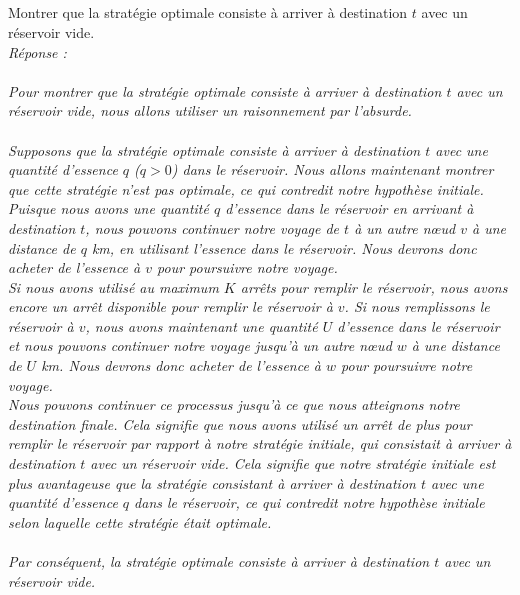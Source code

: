 \documentclass[a4paper,11pt]{article}
\begin{document}
        \subsection{}\label{subsec:Q2}
        Montrer que la stratégie optimale consiste à arriver à destination $t$ avec un réservoir vide.\\\textit{Réponse :\\\\
            Pour montrer que la stratégie optimale consiste à arriver à destination $t$ avec un réservoir vide, nous allons utiliser un raisonnement par l'absurde.\\\\
Supposons que la stratégie optimale consiste à arriver à destination $t$ avec une quantité d'essence $q$ ($q > 0$) dans le réservoir. Nous allons maintenant montrer que cette stratégie n'est pas optimale, ce qui contredit notre hypothèse initiale. \\
Puisque nous avons une quantité $q$ d'essence dans le réservoir en arrivant à destination $t$, nous pouvons continuer notre voyage de $t$ à un autre nœud $v$ à une distance de $q$ km, en utilisant l'essence dans le réservoir. Nous devrons donc acheter de l'essence à $v$ pour poursuivre notre voyage. \\
Si nous avons utilisé au maximum $K$ arrêts pour remplir le réservoir, nous avons encore un arrêt disponible pour remplir le réservoir à $v$. Si nous remplissons le réservoir à $v$, nous avons maintenant une quantité $U$ d'essence dans le réservoir et nous pouvons continuer notre voyage jusqu'à un autre nœud $w$ à une distance de $U$ km. Nous devrons donc acheter de l'essence à $w$ pour poursuivre notre voyage. \\
Nous pouvons continuer ce processus jusqu'à ce que nous atteignons notre destination finale. Cela signifie que nous avons utilisé un arrêt de plus pour remplir le réservoir par rapport à notre stratégie initiale, qui consistait à arriver à destination $t$ avec un réservoir vide. Cela signifie que notre stratégie initiale est plus avantageuse que la stratégie consistant à arriver à destination $t$ avec une quantité d'essence $q$ dans le réservoir, ce qui contredit notre hypothèse initiale selon laquelle cette stratégie était optimale. \\\\
Par conséquent, la stratégie optimale consiste à arriver à destination $t$ avec un réservoir vide.}


    
\end{document}
